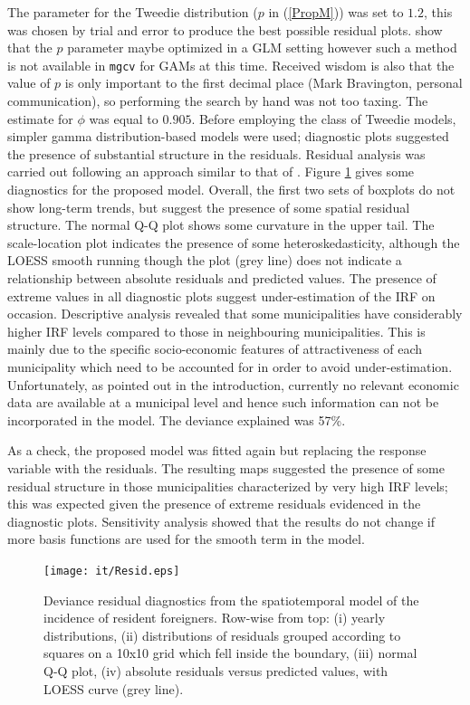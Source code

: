 The parameter for the Tweedie distribution ($p$ in (\ref{PropM})) was set to $1.2$, this was chosen by trial and error to produce the best possible residual plots.  show that the $p$ parameter maybe optimized in a GLM setting however such a method is not available in \texttt{mgcv} for GAMs at this time. Received wisdom is also that the value of $p$ is only important to the first decimal place (Mark Bravington, personal communication), so performing the search by hand was not too taxing. The estimate for $\phi$ was equal to $0.905$. Before employing the class of Tweedie models, simpler gamma distribution-based models were used; diagnostic plots suggested the presence of substantial structure in the residuals. Residual analysis was carried out following an approach similar to that of . Figure \ref{Resid} gives some diagnostics for the proposed model. Overall, the first two sets of boxplots do not show long-term trends, but suggest the presence of some spatial residual structure. The normal Q-Q plot shows some curvature in the upper tail. The scale-location plot indicates the presence of some heteroskedasticity, although the LOESS smooth running though the plot (grey line) does not indicate a relationship between absolute residuals and predicted values. The presence of extreme values in all diagnostic plots suggest under-estimation of the IRF on occasion. Descriptive analysis revealed that some municipalities have considerably higher IRF levels compared to those in neighbouring municipalities. This is mainly due to the specific socio-economic features of attractiveness of each municipality which need to be accounted for in order to avoid under-estimation. Unfortunately, as pointed out in the introduction, currently no relevant economic data are available at a municipal level and hence such information can not be incorporated in the model. The deviance explained was 57\%. 

As a check, the proposed model was fitted again but replacing the response variable with the residuals. The resulting maps suggested the presence of some residual structure in those municipalities characterized by very high IRF levels; this was expected given the presence of extreme residuals evidenced in the diagnostic plots. Sensitivity analysis showed that the results do not change if more basis functions are used for the smooth term in the model. 

\begin{figure}[tbp]
	\centering
		\texttt{[image: it/Resid.eps]}
	\caption{Deviance residual diagnostics from the spatiotemporal model of the incidence of resident foreigners. Row-wise from top: (i) yearly distributions, (ii) distributions of residuals grouped according to squares on a 10x10 grid which fell inside the boundary, (iii) normal Q-Q plot, (iv) absolute residuals versus predicted values, with LOESS curve (grey line).}
	\label{Resid}
\end{figure}

